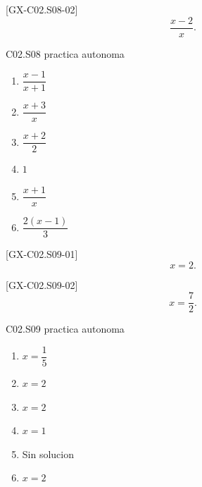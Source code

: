 \begin{shortanswer}{[GX-C02.S08-02]}
\[
\frac{x-2}{x}.
\]
\end{shortanswer}

\begin{shortanswer}{C02.S08 practica autonoma}
\begin{enumerate}[label=\textbf{PX-C02.S08-\arabic*:}, leftmargin=*]
  \item \(\dfrac{x-1}{x+1}\)
  \item \(\dfrac{x+3}{x}\)
  \item \(\dfrac{x+2}{2}\)
  \item \(1\)
  \item \(\dfrac{x+1}{x}\)
  \item \(\dfrac{2(x-1)}{3}\)
\end{enumerate}
\end{shortanswer}

\begin{shortanswer}{[GX-C02.S09-01]}
\[
x=2.
\]
\end{shortanswer}

\begin{shortanswer}{[GX-C02.S09-02]}
\[
x=\frac{7}{2}.
\]
\end{shortanswer}

\begin{shortanswer}{C02.S09 practica autonoma}
\begin{enumerate}[label=\textbf{PX-C02.S09-\arabic*:}, leftmargin=*]
  \item \(x=\dfrac{1}{5}\)
  \item \(x=2\)
  \item \(x=2\)
  \item \(x=1\)
  \item Sin solucion
  \item \(x=2\)
\end{enumerate}
\end{shortanswer}
